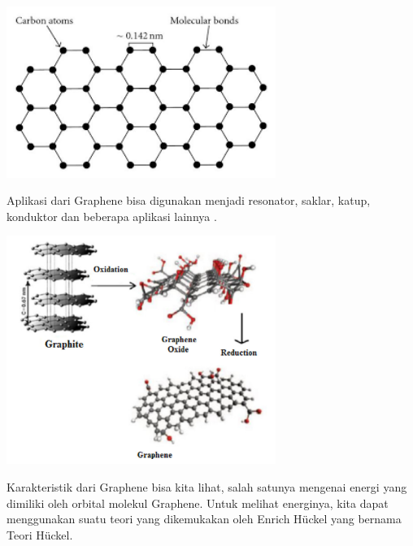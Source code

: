 \documentclass[12pt,a4paper]{report}
\begin{document}
	\begin{center}
	\includegraphics[width=8.75cm]{gambar/grafen.png}
	\end{center}
	
	Aplikasi dari Graphene bisa digunakan menjadi resonator, saklar, katup, konduktor dan beberapa aplikasi lainnya \cite{Clemons2010}.
	
	\begin{center}
		\includegraphics[width=8.75cm]{gambar/oksgraf.png}
	\end{center}
	
	Karakteristik dari Graphene bisa kita lihat, salah satunya mengenai energi yang dimiliki oleh orbital molekul Graphene. Untuk melihat energinya, kita dapat menggunakan suatu teori yang dikemukakan oleh Enrich Hückel yang bernama Teori Hückel. 
	
\end{document}
